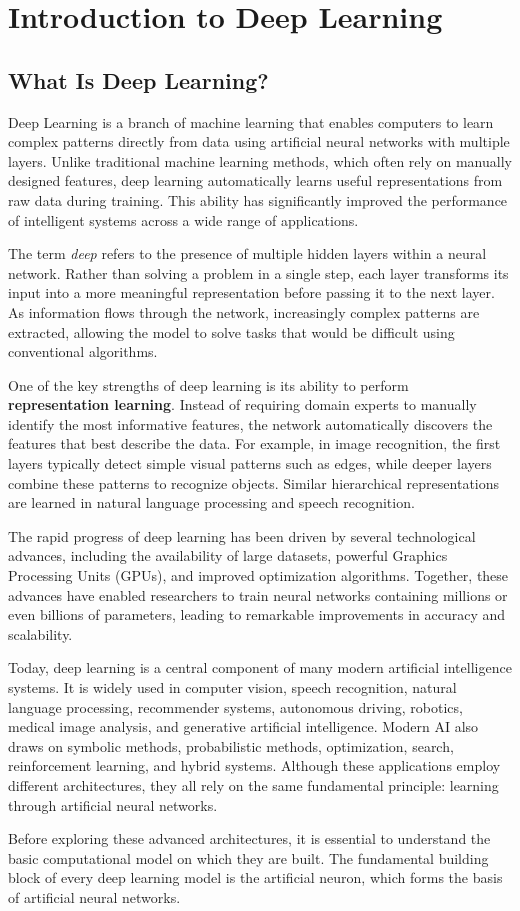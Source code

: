 \chapter*{Introduction to Deep Learning}

\section*{What Is Deep Learning?}

Deep Learning is a branch of machine learning that enables computers to learn complex patterns directly from data using artificial neural networks with multiple layers. Unlike traditional machine learning methods, which often rely on manually designed features, deep learning automatically learns useful representations from raw data during training. This ability has significantly improved the performance of intelligent systems across a wide range of applications.

The term \textit{deep} refers to the presence of multiple hidden layers within a neural network. Rather than solving a problem in a single step, each layer transforms its input into a more meaningful representation before passing it to the next layer. As information flows through the network, increasingly complex patterns are extracted, allowing the model to solve tasks that would be difficult using conventional algorithms.

One of the key strengths of deep learning is its ability to perform \textbf{representation learning}. Instead of requiring domain experts to manually identify the most informative features, the network automatically discovers the features that best describe the data. For example, in image recognition, the first layers typically detect simple visual patterns such as edges, while deeper layers combine these patterns to recognize objects. Similar hierarchical representations are learned in natural language processing and speech recognition.

The rapid progress of deep learning has been driven by several technological advances, including the availability of large datasets, powerful Graphics Processing Units (GPUs), and improved optimization algorithms. Together, these advances have enabled researchers to train neural networks containing millions or even billions of parameters, leading to remarkable improvements in accuracy and scalability.

Today, deep learning is a central component of many modern artificial intelligence systems. It is widely used in computer vision, speech recognition, natural language processing, recommender systems, autonomous driving, robotics, medical image analysis, and generative artificial intelligence. Modern AI also draws on symbolic methods, probabilistic methods, optimization, search, reinforcement learning, and hybrid systems. Although these applications employ different architectures, they all rely on the same fundamental principle: learning through artificial neural networks.

Before exploring these advanced architectures, it is essential to understand the basic computational model on which they are built. The fundamental building block of every deep learning model is the artificial neuron, which forms the basis of artificial neural networks.
